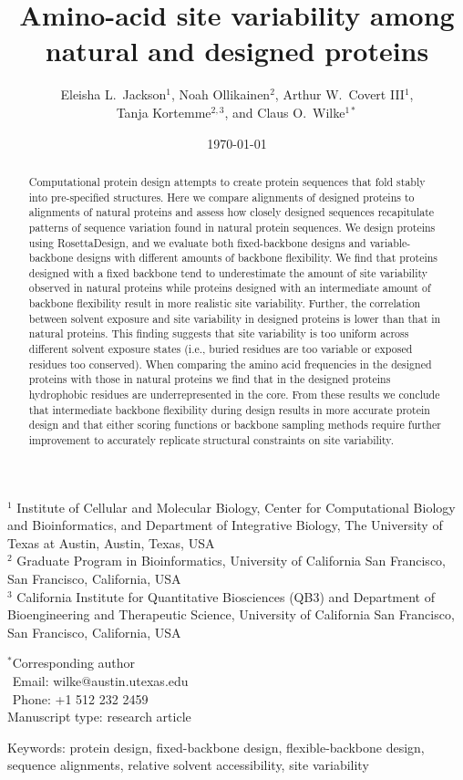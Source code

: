 \documentclass[12pt]{article}
\title{Amino-acid site variability among natural and designed proteins}
\author{Eleisha L.\ Jackson$^1$, Noah Ollikainen$^2$, Arthur W.\ Covert III$^1$,\\ Tanja Kortemme$^{2,3}$, and Claus O.\ Wilke$^{1*}$}
\begin{document}
\date{\today}
\maketitle

\noindent
$^1$ Institute of Cellular and Molecular Biology, Center for Computational Biology and Bioinformatics, and Department of Integrative Biology, The University of Texas at Austin, Austin, Texas, USA\\
$^2$ Graduate Program in Bioinformatics, University of California San Francisco, San Francisco, California, USA\\
$^3$ California Institute for Quantitative Biosciences (QB3) and Department of Bioengineering and Therapeutic Science, University of California San Francisco, San Francisco, California, USA

\bigskip
\noindent
$^*$Corresponding author\\
$\phantom{^*}$Email: wilke@austin.utexas.edu\\
$\phantom{^*}$Phone: +1 512 232 2459\\

\bigskip
\noindent
Manuscript type: research article

\bigskip
\noindent Keywords: protein design, fixed-backbone design, flexible-backbone design, sequence alignments, relative solvent accessibility, site variability

\newpage
\begin{abstract}
Computational protein design attempts to create protein sequences that fold stably into pre-specified structures. Here we compare alignments of designed proteins to alignments of natural proteins and assess how closely designed sequences recapitulate patterns of sequence variation found in natural protein sequences. We design proteins using RosettaDesign, and we evaluate both fixed-backbone designs and variable-backbone designs with different amounts of backbone flexibility. We find that proteins designed with a fixed backbone tend to underestimate the amount of site variability observed in natural proteins while proteins designed with an intermediate amount of backbone flexibility result in more realistic site variability. Further, the correlation between solvent exposure and site variability in designed proteins is lower than that in natural proteins. This finding suggests that site variability is too uniform across different solvent exposure states (i.e., buried residues are too variable or exposed residues too conserved). When comparing the amino acid frequencies in the designed proteins with those in natural proteins we find that in the designed proteins hydrophobic residues are underrepresented in the core. From these results we conclude that intermediate backbone flexibility during design results in more accurate protein design and that either scoring functions or backbone sampling methods require further improvement to accurately replicate structural constraints on site variability.
\end{abstract}
\end{document}
